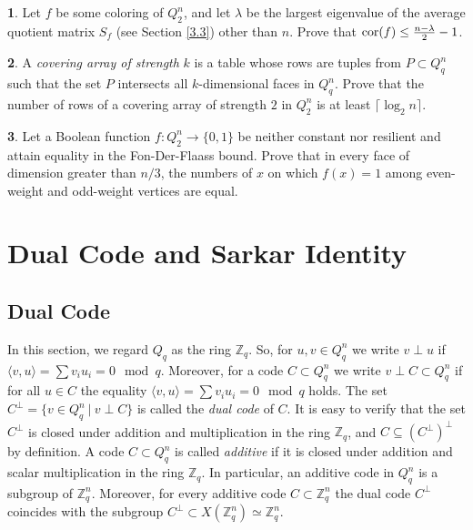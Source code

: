 \documentclass[11pt]{article}
\theoremstyle{definition}
\newtheorem{exercise}{\quad}
\newcommand{\cor}{{\rm cor}}
\begin{document}
{{{\begin{exercise}
Let $f$ be some coloring of $Q_2^n$, and let $\lambda$ be the largest eigenvalue of  the average quotient matrix $S_f$ (see Section \ref{3.3}) other than  $n$. Prove that $\cor(f)\leq\frac{n-\lambda}{2}-1$.
\end{exercise}



\begin{exercise}
A {\sl covering array of strength} $k$ is a table
whose rows are tuples from $P\subset Q^n_q$ such that the set
$P$ intersects all $k$-dimensional faces in $Q^n_q$. Prove
that the number of rows of a covering array of strength $2$ in $Q^n_2$ is at least
$\lceil\log_2 n\rceil$.
\end{exercise}

\begin{exercise}
Let a Boolean function $f: Q_2^n\rightarrow \{0,1\}$ be neither constant nor resilient and attain equality in the Fon-Der-Flaass  bound. Prove that in every face of dimension greater than $n/3$, the numbers of $x$ on which  $f(x)=1$ among even-weight and odd-weight vertices are  equal.
\end{exercise}




\section{Dual Code and Sarkar Identity}


\subsection{Dual Code}\label{12.1}

In this section, we regard $Q_q$ as the ring  $\mathbb{Z}_q$. So, for $u,v \in Q^n_q$
we write $v\perp u$ if $\langle v,u\rangle=\sum v_iu_i=0 \mod q$. Moreover,  for a code $C\subset Q_q^n$ we write   $v\perp C\subset Q_q^n$ if for all $u\in C$
the equality $\langle v,u\rangle=\sum v_iu_i=0 \mod q$ holds.
 The set
$C^\perp=\{v\in Q^n_q \ |\ v\perp C\}$ is called the {\sl  dual code} of $C$.
It is easy to verify that the set $C^\perp$ is closed under
addition and multiplication in the ring $\mathbb{Z}_q$, and 
 $C\subseteq (C^\perp)^\perp$ by definition.
A code $C\subset Q_q^n$ is called {\sl additive} if it is closed under
addition and scalar multiplication in the ring $\mathbb{Z}_q$. In particular, an additive code in $Q^n_q$ is a subgroup of $\mathbb{Z}_q^n$. Moreover, for every additive code $C\subset \mathbb{Z}_q^n$ the dual code $C^\perp$ coincides with 
the subgroup $C^\perp\subset X(\mathbb{Z}_q^n)\simeq \mathbb{Z}_q^n $.

}}}
\end{document}
